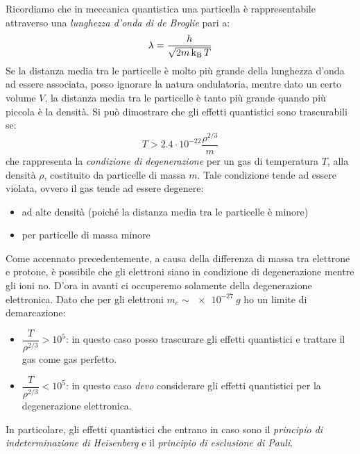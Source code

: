 Ricordiamo che in meccanica quantistica una particella è rappresentabile attraverso una \emph{lunghezza d'onda di de Broglie} pari a:
\begin{equation}\label{eq:lunghezza-de-broglie}
    \lambda = \dfrac{h}{\sqrt{2 m \operatorname{k_B} T}}
\end{equation}
Se la distanza media tra le particelle è molto più grande della lunghezza d'onda ad essere associata, posso ignorare la natura ondulatoria, mentre dato un certo volume $V$, la distanza media tra le particelle è tanto più grande quando più piccola è la densità. Si può dimostrare che gli effetti quantistici sono trascurabili se:
\[
T > 2.4\cdot 10^{-22} \frac{\rho^{2/3}}{m}
\]
che rappresenta la \emph{condizione di degenerazione} per un gas di temperatura $T$, alla densità $\rho$, costituito da particelle di massa $m$. Tale condizione tende ad essere violata, ovvero il gas tende ad essere degenere:
\begin{itemize}
    \item ad alte densità (poiché la distanza media tra le particelle è minore)
    \item  per particelle di massa minore
\end{itemize}

Come accennato precedentemente, a causa della differenza di massa tra elettrone e protone, è possibile che gli elettroni siano in condizione di degenerazione mentre gli ioni no. D'ora in avanti ci occuperemo solamente della degenerazione elettronica. Dato che per gli elettroni $m_e \sim \SI{e-27}{g}$ ho un limite di demarcazione:
\begin{itemize}
    \item $\dfrac{T}{\rho^{2/3}} > 10^5$: in questo caso posso trascurare gli effetti quantistici e trattare il gas come gas perfetto.
    \item $\dfrac{T}{\rho^{2/3}} < 10^5$: in questo caso \emph{devo} considerare gli effetti quantistici per la degenerazione elettronica.
\end{itemize}

In particolare, gli effetti quantistici che entrano in caso sono il \emph{principio di indeterminazione di Heisenberg} e il \emph{principio di esclusione di Pauli}.

